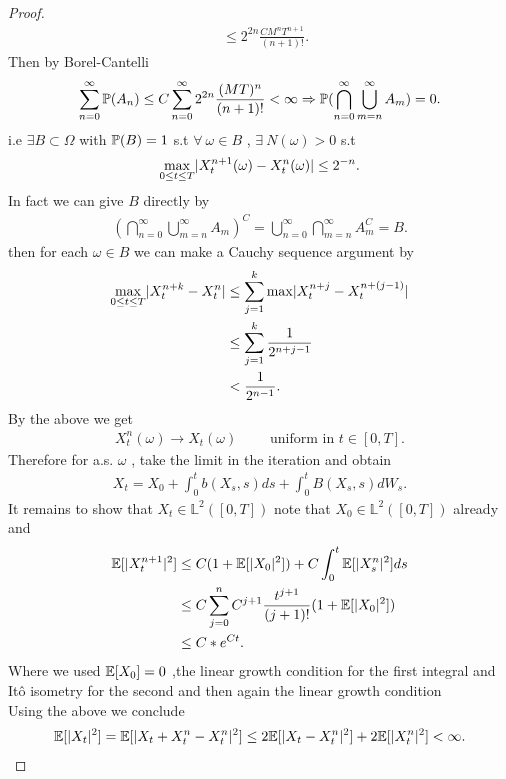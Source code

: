 \begin{proof}
\begin{align*}
                                                                      &\le 2^{2n} \frac{CM^{n}T^{n+1}  }{(n+1)!} 
  .\end{align*}
  Then by Borel-Cantelli
  \begin{align*}
    \sum_{n=0}^{\infty} \P(A_n) \le  C \sum_{n=0}^{\infty}2^{2n} \frac{(MT)^{n} }{(n+1)!}    <\infty \implies \P(\bigcap_{n=0}^{\infty} \bigcup_{m=n}^{\infty} A_m ) = 0
   .\end{align*}
   i.e $\exists  B \subset  \Omega  $ with $\P(B) = 1$ s.t $\forall \ \omega  \in  B$ , $\exists \ N(\omega ) > 0 $ s.t
   \begin{align*}
     \max_{0\le t\le T} \abs{X_t^{n+1}(\omega ) - X_t^{n}(\omega )} \le  2^{-n} 
   .\end{align*}
   In fact we can give $B$ directly by 
   \begin{align*}
     \left( \bigcap_{n=0}^{\infty} \bigcup_{m=n}^{\infty} A_m   \right)^{C} = \bigcup_{n=0}^{\infty} \bigcap_{m=n}^{\infty} A_m^{C} = B     
   .\end{align*}
   then for each $\omega  \in  B$  we can make a Cauchy sequence argument by
   \begin{align*}
     \max_{0\le t\le T} \abs{X_t^{n+k} - X^{n}_t } &\le  \sum_{j=1}^{k} \max \abs{X_t^{n+j} - X^{n+(j-1)}_t } \\
                                                   &\le \sum_{j=1}^{k} \frac{1}{2^{n+j-1} }\\
                                                   &< \frac{1}{2^{n-1} } 
   .\end{align*}
   By the above we get 
   \begin{align*}
     X_t^{n}(\omega ) \to X_t(\omega ) \qquad \text{ uniform in } t\in [0,T]
   .\end{align*}
   Therefore for a.s. $\omega $ , take the limit in the iteration  and obtain 
   \begin{align*}
    X_t = X_{0} + \int_0^{t} b(X_s,s) ds + \int_0^{t} B(X_s,s) dW_s  
   .\end{align*}
   It remains to show that $X_t \in  \mathbb{L}^2([0,T])$ note that $X_{0} \in  \mathbb{L}^2([0,T])$ already and 
   \begin{align*}
     \E[\abs{X_t^{n+1}}^2] &\le  C(1+\E[\abs{X_0}^2]) + C \int_0^{t} \E[\abs{X_s^{n} }^2] ds \\
                           &\le  C \sum_{j=0}^{n} C^{j+1} \frac{t^{j+1}}{(j+1)!} (1+\E[\abs{X_0}^2]) \\
                           &\le  C* e^{Ct} 
   .\end{align*}
   Where we used $\E[X_{0}] = 0$ ,the  linear growth condition for the first integral and It\^o isometry for the second and then again the linear growth condition\\[1ex]
    Using the above we conclude
    \begin{align*}
      \E[\abs{X_t}^2] = \E[\abs{X_t + X_t^n -X_t^n}^2] \le  2\E[\abs{X_t - X_t^n}^2] + 2\E[\abs{X_t^n}^2] < \infty
    .\end{align*}
\end{proof}
